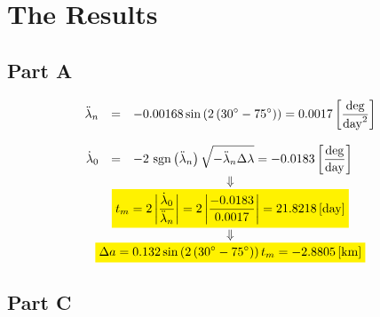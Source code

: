 \documentclass[12pt, a4paper]{article}
\begin{document}
\newpage

\section{The Results}
\subsection{Part A}
\begin{equation}
    \begin{matrix}
        \begin{array}{rcl}
            \ddot{\lambda}_n&=&\displaystyle-0.00168\sin\left(2\left(30^\circ-75^\circ\right)\right)=0.0017\left[\frac{\mathrm{deg}}{\mathrm{day}^2}\right] \\\\
            \dot{\lambda}_0&=&\displaystyle-2\mathrm{\ sgn}\left(\ddot{\lambda}_n\right)\sqrt{-\ddot{\lambda}_n\Delta\lambda}=-0.0183\left[\frac{\mathrm{deg}}{\mathrm{day}}\right] \\
        \end{array} \\
        \Downarrow \\
        \colorbox{yellow}{$\displaystyle t_m=2\left|\frac{\dot{\lambda}_0}{\ddot{\lambda}_n}\right|=2\left|\frac{-0.0183}{0.0017}\right|=21.8218\left[\mathrm{day}\right]$} \\
        \Downarrow \\
        \colorbox{yellow}{$\displaystyle\Delta a=0.132\sin\left(2\left(30^\circ-75^\circ\right)\right)t_m=-2.8805\left[\mathrm{km}\right]$}
    \end{matrix}
\end{equation}

\subsection{Part C}
\end{document}
